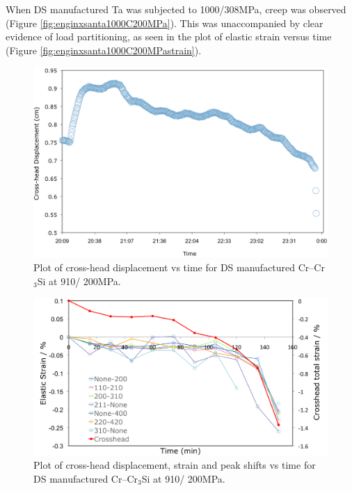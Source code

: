 When DS manufactured Ta was subjected to 1000\celsius/308MPa, creep was observed (Figure \ref{fig:enginxsanta1000C200MPa}).  This was unaccompanied by clear evidence of load partitioning, as seen in the plot of elastic strain versus time (Figure \ref{fig:enginxsanta1000C200MPastrain}).

%
\begin{figure}[H]
\begin{center}
\includegraphics[width=14cm]{enginxcr910C200MPa}
\vspace{-2mm}
\caption{Plot of cross-head displacement vs time for DS manufactured Cr--Cr$_3$Si at 910\celsius/ 200MPa.}\label{fig:enginxcr910C200MPa}
\end{center}
\end{figure}  
%
%
\begin{figure}[H]
\begin{center}
\includegraphics[width=16cm]{enginxcr910C200MPastrain}
\vspace{-2mm}
\caption{Plot of cross-head displacement, strain and peak shifts vs time for DS manufactured Cr--Cr$_3$Si at 910\celsius/ 200MPa.}\label{fig:enginxcr910Cstrain}
\end{center}
\end{figure}  
